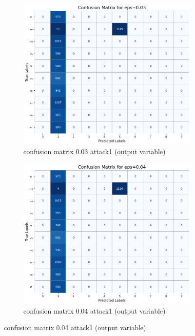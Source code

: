 \documentclass[11pt,onside]{article}
\begin{document}
\begin{figure}[h]
  \centering
  \begin{subfigure}[b]{0.49\textwidth}
    \centering
    \includegraphics[width=\textwidth]{V2_images/target_confusion_matrix_eps_0.03_attack_1.png}
    \caption{confusion matrix 0.03 attack1 (output variable)}
    \label{fig:image1}
  \end{subfigure}
  \hfill
  \begin{subfigure}[b]{0.49\textwidth}
    \centering
    \includegraphics[width=\textwidth]{V2_images/target_confusion_matrix_eps_0.04_attack_1.png}
    \caption{confusion matrix 0.04 attack1 (output variable)}
    \label{fig:image2}
  \end{subfigure}
 
  \label{fig:images}
\end{figure}
\end{document}
